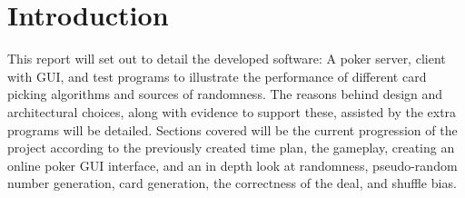 \section{Introduction}
This report will set out to detail the developed software: A poker server,
client with GUI, and test programs to illustrate the performance of different
card picking algorithms and sources of randomness. The reasons behind design
and architectural choices, along with evidence to support these, assisted by
the extra programs will be detailed. Sections covered will be the current
progression of the project according to the previously created time plan, the
gameplay, creating an online poker GUI interface, and an in depth look
at randomness, pseudo-random number generation, card generation, the
correctness of the deal, and shuffle bias.
